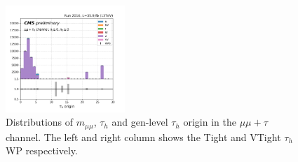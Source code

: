 \begin{figure}
    \includegraphics[width=0.4\textwidth]{chapters/Appendix/sectionJetToTauh/figures/mumutau_tauGenFlavor_pickles_lltauVTight.png}
    \caption{Distributions of $m_{\mu\mu}$, $\tau_h$ \pt and gen-level $\tau_h$ origin in the $\mu\mu+\tau$ channel. The left and right column shows the Tight and VTight $\tau_h$ WP respectively.}
    \label{fig:appendix:fakeTauId:mumutau}
\end{figure}


